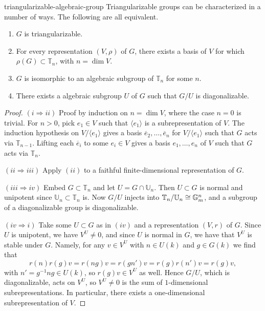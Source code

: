 \begin{example}{triangularizable-algebraic-group}
    Triangularizable groups can be characterized in a number of ways. The following are all equivalent.
    \begin{enumerate}[label=(\roman*)]
        \item $G$ is triangularizable.
        \item For every representation $(V, \rho)$ of $G$, there exists a basis of $V$ for which $\rho(G) \subset \mathbb{T}_n$, with $n = \dim V$.
        \item $G$ is isomorphic to an algebraic subgroup of $\mathbb{T}_n$ for some $n$.
        \item There exists a   algebraic subgroup $U$ of $G$ such that $G/U$ is diagonalizable.
    \end{enumerate}
    \begin{proof}
        $(i \Rightarrow ii)$ Proof by induction on $n = \dim V$, where the case $n = 0$ is trivial. For $n > 0$, pick $e_1 \in V$ such that $\langle e_1 \rangle$ is a subrepresentation of $V$. The induction hypothesis on $V / \langle e_1 \rangle$ gives a basis $\overline{e}_2, \ldots, \overline{e}_n$ for $V / \langle e_1 \rangle$ such that $G$ acts via $\mathbb{T}_{n - 1}$. Lifting each $\overline{e}_i$ to some $e_i \in V$ gives a basis $e_1, \ldots, e_n$ of $V$ such that $G$ acts via $\mathbb{T}_n$.
        
        $(ii \Rightarrow iii)$ Apply $(ii)$ to a faithful finite-dimensional representation of $G$.
        
        $(iii \Rightarrow iv)$ Embed $G \subset \mathbb{T}_n$ and let $U = G \cap \mathbb{U}_n$. Then $U \subset G$ is normal and unipotent since $\mathbb{U}_n \subset \mathbb{T}_n$ is. Now $G/U$ injects into $\mathbb{T}_n/\mathbb{U}_n \cong \mathbb{G}_m^n$, and a subgroup of a diagonalizable group is diagonalizable.
        
        $(iv \Rightarrow i)$ Take some $U \subset G$ as in $(iv)$ and a representation $(V, r)$ of $G$. Since $U$ is unipotent, we have $V^U \ne 0$, and since $U$ is normal in $G$, we have that $V^U$ is stable under $G$. Namely, for any $v \in V^U$ with $n \in U(k)$ and $g \in G(k)$ we find that
        \[ r(n) r(g) v = r(ng) v = r(gn') v = r(g) r(n') v = r(g) v , \]
        with $n' = g^{-1} n g \in U(k)$, so $r(g) v \in V^U$ as well. Hence $G/U$, which is diagonalizable, acts on $V^U$, so $V^U \ne 0$ is the sum of $1$-dimensional subrepresentations. In particular, there exists a one-dimensional subrepresentation of $V$.
    \end{proof}
\end{example}

